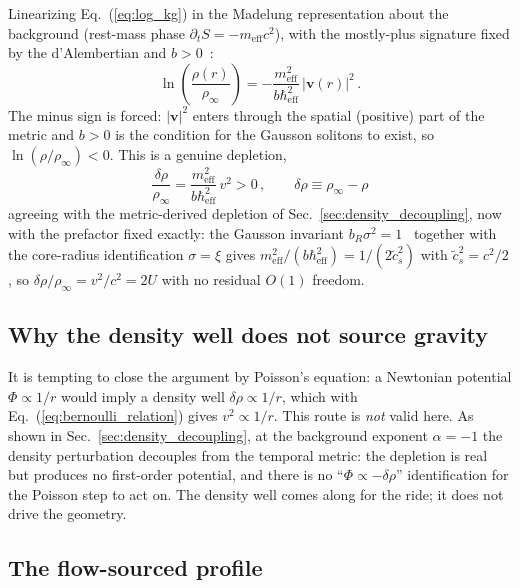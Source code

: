 \documentclass[12pt, a4paper]{article}
\newcommand{\meff}{m_{\mathrm{eff}}}
\newcommand{\heff}{\hbar_{\mathrm{eff}}}
\begin{document}
Linearizing Eq.~(\ref{eq:log_kg}) in the Madelung representation about the background (rest-mass phase $\partial_t S = -\meff c^2$), with the mostly-plus signature fixed by the d'Alembertian and $b > 0$~\cite{kulangiev_2026}:
\begin{equation}
    \ln\!\left(\frac{\rho(r)}{\rho_\infty}\right) = -\frac{\meff^2}{b\heff^2}\,|\mathbf{v}(r)|^2\,.
\label{eq:bernoulli_log}
\end{equation}
The minus sign is forced: $|\mathbf{v}|^2$ enters through the spatial (positive) part of the metric and $b>0$ is the condition for the Gausson solitons to exist, so $\ln(\rho/\rho_\infty)<0$. This is a genuine depletion,
\begin{equation}
    \boxed{\;\frac{\delta\rho}{\rho_\infty} = \frac{\meff^2}{b\heff^2}\,v^2 > 0\,,\qquad \delta\rho \equiv \rho_\infty - \rho\;}
\label{eq:bernoulli_relation}
\end{equation}
agreeing with the metric-derived depletion of Sec.~\ref{sec:density_decoupling}, now with the prefactor fixed exactly: the Gausson invariant $b_R\sigma^2=1$~\cite{kulangiev_2026e} together with the core-radius identification $\sigma=\xi$ gives $\meff^2/(b\heff^2) = 1/(2\tilde{c}_s^2)$ with $\tilde{c}_s^2 = c^2/2$, so $\delta\rho/\rho_\infty = v^2/c^2 = 2U$ with no residual $O(1)$ freedom.

\subsection{Why the density well does not source gravity}

It is tempting to close the argument by Poisson's equation: a Newtonian potential $\Phi \propto 1/r$ would imply a density well $\delta\rho \propto 1/r$, which with Eq.~(\ref{eq:bernoulli_relation}) gives $v^2 \propto 1/r$. This route is \emph{not} valid here. As shown in Sec.~\ref{sec:density_decoupling}, at the background exponent $\alpha = -1$ the density perturbation decouples from the temporal metric: the depletion is real but produces no first-order potential, and there is no ``$\Phi \propto -\delta\rho$'' identification for the Poisson step to act on. The density well comes along for the ride; it does not drive the geometry.

\subsection{The flow-sourced profile}
\end{document}
